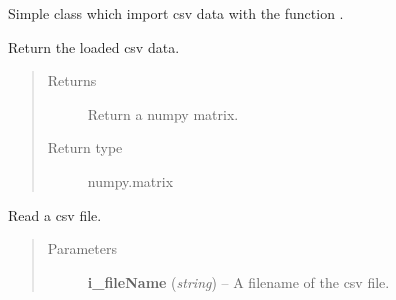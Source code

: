 \documentclass[letterpaper,10pt,english]{sphinxmanual}
\begin{document}
\begin{fulllineitems}
\label{tica:Tica_DataImport.TicaDataImport}
Simple class which import csv data with the  function .

\begin{fulllineitems}
\label{tica:Tica_DataImport.TicaDataImport.getData}
Return the loaded csv data.
\begin{quote}\begin{description}
\item[{Returns}] \leavevmode
Return a numpy matrix.

\item[{Return type}] \leavevmode
numpy.matrix

\end{description}\end{quote}

\end{fulllineitems}


\begin{fulllineitems}
\label{tica:Tica_DataImport.TicaDataImport.readTable}
Read a csv file.
\begin{quote}\begin{description}
\item[{Parameters}] \leavevmode
\textbf{i\_fileName} (\emph{string}) -- A filename of the csv file.

\end{description}\end{quote}

\end{fulllineitems}


\end{fulllineitems}
\end{document}

